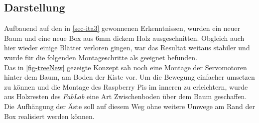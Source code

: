 \documentclass[.../Dokumentation.tex]{subfiles}
\begin{document}
\subsection{Darstellung}\label{sec-ita4-visualization}
Aufbauend auf den in \ref{sec-ita3} gewonnenen Erkenntnissen, wurden ein neuer 
Baum und eine neue Box aus 6mm dickem Holz ausgeschnitten. Obgleich auch hier 
wieder einige Blätter verloren gingen, war das Resultat weitaus stabiler und 
wurde für die folgenden Montageschritte als geeignet befunden.\\
Das in \ref{fig-treeNew} gezeigte Konzept sah noch eine Montage der 
Servomotoren hinter dem Baum, am Boden der Kiste vor. 
Um die Bewegung einfacher umsetzen zu können und die Montage des Raspberry 
Pis im inneren zu erleichtern, wurde aus Holzresten des \textit{FabLab} eine 
Art Zwischenboden über dem Baum geschaffen. Die Aufhängung der Äste soll 
auf diesem Weg ohne weitere Umwege am Rand der Box realisiert werden können.
\end{document}
